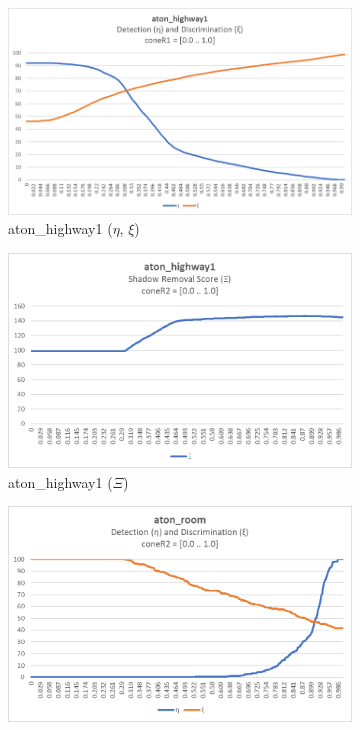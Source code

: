 \begin{figure}
\hfill
\begin{subfigure}{.45\linewidth}
  \includegraphics[width=1\linewidth]{figures/highway1_coneR1_response.jpg}
  \caption{aton\_highway1 ($\eta$, $\xi$)}
\end{subfigure}
\hfill
  \begin{subfigure}{.45\linewidth}
  \includegraphics[width=1\linewidth]{figures/highway1_coneR2_score.jpg}
  \caption{aton\_highway1 ($\Xi$)}
\end{subfigure}
\hfill
\begin{subfigure}{.45\linewidth}
  \includegraphics[width=1\linewidth]{figures/room_coneR2_response.jpg}

\end{subfigure}
\end{figure}
